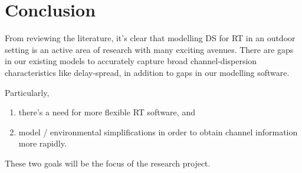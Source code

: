 \documentclass[lettersize,journal]{IEEEtran}
\begin{document}

\section{Conclusion}
From reviewing the literature, it's clear that modelling DS for RT in an outdoor setting is an active area of research with many exciting avenues. There are gaps in our existing models to accurately capture broad channel-dispersion characteristics like delay-spread, in addition to gaps in our modelling software.

Particularly,
\begin{enumerate}
	\item there's a need for more flexible RT software, and
	\item model / environmental simplifications in order to obtain channel information more rapidly.
\end{enumerate}

These two goals will be the focus of the research project.
\end{document}
